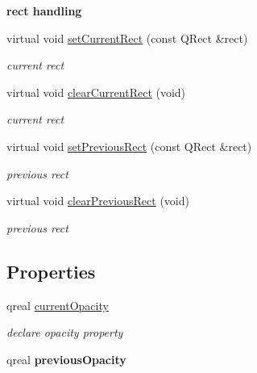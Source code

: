 \begin{Indent}\textbf{ rect handling}\par
\begin{DoxyCompactItemize}
\item 
\mbox{\label{class_menu_bar_data_v1_abc65626b800693142f43865f497b0569}} 
virtual void \hyperlink{class_menu_bar_data_v1_abc65626b800693142f43865f497b0569}{set\+Current\+Rect} (const Q\+Rect \&rect)
\begin{DoxyCompactList}\small\item\em current rect \end{DoxyCompactList}\item 
\mbox{\label{class_menu_bar_data_v1_afc67762e1d956437b1a952b46259355f}} 
virtual void \hyperlink{class_menu_bar_data_v1_afc67762e1d956437b1a952b46259355f}{clear\+Current\+Rect} (void)
\begin{DoxyCompactList}\small\item\em current rect \end{DoxyCompactList}\item 
\mbox{\label{class_menu_bar_data_v1_afb6105fc76b4131aa8b225868ed710fe}} 
virtual void \hyperlink{class_menu_bar_data_v1_afb6105fc76b4131aa8b225868ed710fe}{set\+Previous\+Rect} (const Q\+Rect \&rect)
\begin{DoxyCompactList}\small\item\em previous rect \end{DoxyCompactList}\item 
\mbox{\label{class_menu_bar_data_v1_ad85198eeade4645405ac2e7b1a90c18e}} 
virtual void \hyperlink{class_menu_bar_data_v1_ad85198eeade4645405ac2e7b1a90c18e}{clear\+Previous\+Rect} (void)
\begin{DoxyCompactList}\small\item\em previous rect \end{DoxyCompactList}\end{DoxyCompactItemize}
\end{Indent}
\subsection*{Properties}
\begin{DoxyCompactItemize}
\item 
\mbox{\label{class_menu_bar_data_v1_a14c20df3f6fdafd973c92553e4547977}} 
qreal \hyperlink{class_menu_bar_data_v1_a14c20df3f6fdafd973c92553e4547977}{current\+Opacity}
\begin{DoxyCompactList}\small\item\em declare opacity property \end{DoxyCompactList}\item 
\mbox{\label{class_menu_bar_data_v1_acff198d217b18fc55074340fa24c8741}} 
qreal {\bfseries previous\+Opacity}
\end{DoxyCompactItemize}
